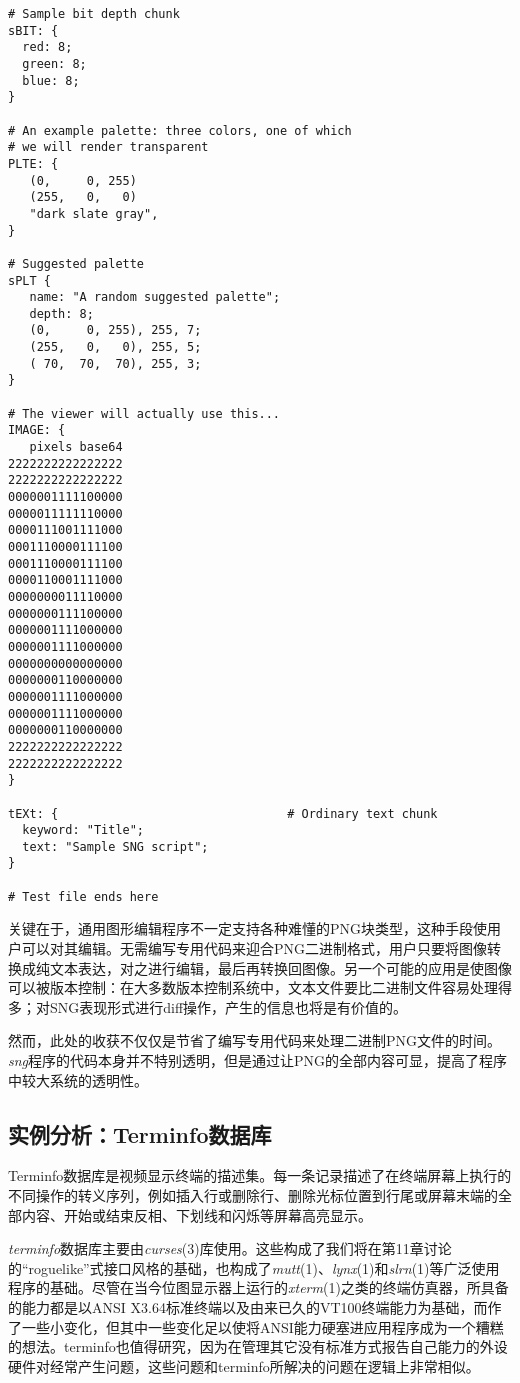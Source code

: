 \documentclass[12pt,oneside]{ctexbook}
\begin{document}
\begin{common-format}
\begin{Verbatim}[label=例6.2  SNG实例]
# Sample bit depth chunk
sBIT: {
  red: 8;
  green: 8;
  blue: 8;
}

# An example palette: three colors, one of which
# we will render transparent
PLTE: {
   (0,     0, 255)
   (255,   0,   0)
   "dark slate gray",
}

# Suggested palette
sPLT {
   name: "A random suggested palette";
   depth: 8;
   (0,     0, 255), 255, 7;
   (255,   0,   0), 255, 5;
   ( 70,  70,  70), 255, 3;
}

# The viewer will actually use this...
IMAGE: {
   pixels base64
2222222222222222
2222222222222222
0000001111100000
0000011111110000
0000111001111000
0001110000111100
0001110000111100
0000110001111000
0000000011110000
0000000111100000
0000001111000000
0000001111000000
0000000000000000
0000000110000000
0000001111000000
0000001111000000
0000000110000000
2222222222222222
2222222222222222
}

tEXt: {                                # Ordinary text chunk
  keyword: "Title";
  text: "Sample SNG script";
}

# Test file ends here

\end{Verbatim}

关键在于，通用图形编辑程序不一定支持各种难懂的PNG块类型，这种手段使用户可以对其编辑。无需编写专用代码来迎合PNG二进制格式，用户只要将图像转换成纯文本表达，对之进行编辑，最后再转换回图像。另一个可能的应用是使图像可以被版本控制：在大多数版本控制系统中，文本文件要比二进制文件容易处理得多；对SNG表现形式进行diff操作，产生的信息也将是有价值的。

然而，此处的收获不仅仅是节省了编写专用代码来处理二进制PNG文件的时间。\textit{sng}程序的代码本身并不特别透明，但是通过让PNG的全部内容可显，提高了程序中较大系统的透明性。


\subsection{实例分析：Terminfo数据库}
Terminfo数据库是视频显示终端的描述集。每一条记录描述了在终端屏幕上执行的不同操作的转义序列，例如插入行或删除行、删除光标位置到行尾或屏幕末端的全部内容、开始或结束反相、下划线和闪烁等屏幕高亮显示。

\textit{terminfo}数据库主要由\textit{curses}(3)库使用。这些构成了我们将在第11章讨论的“roguelike”式接口风格的基础，也构成了\textit{mutt}(1)、\textit{lynx}(1)和\textit{slrn}(1)等广泛使用程序的基础。尽管在当今位图显示器上运行的\textit{xterm}(1)之类的终端仿真器，所具备的能力都是以ANSI X3.64标准终端以及由来已久的VT100终端能力为基础，而作了一些小变化，但其中一些变化足以使将ANSI能力硬塞进应用程序成为一个糟糕的想法。terminfo也值得研究，因为在管理其它没有标准方式报告自己能力的外设硬件对经常产生问题，这些问题和terminfo所解决的问题在逻辑上非常相似。


\end{common-format}
\end{document}
